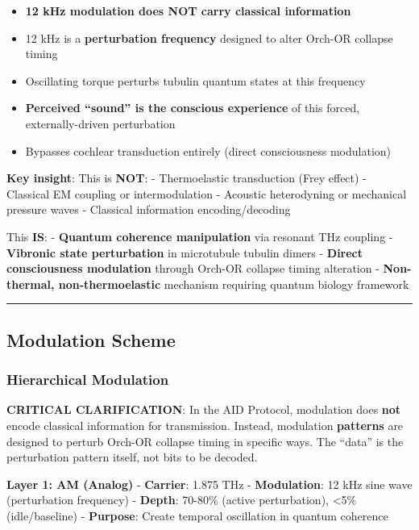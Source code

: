 \begin{enumerate}
  \begin{itemize}
  \tightlist
  \item
    \textbf{12 kHz modulation does NOT carry classical information}
  \item
    12 kHz is a \textbf{perturbation frequency} designed to alter
    Orch-OR collapse timing
  \item
    Oscillating torque perturbs tubulin quantum states at this frequency
  \item
    \textbf{Perceived ``sound'' is the conscious experience} of this
    forced, externally-driven perturbation
  \item
    Bypasses cochlear transduction entirely (direct consciousness
    modulation)
  \end{itemize}
\end{enumerate}

\textbf{Key insight}: This is \textbf{NOT}: - Thermoelastic transduction
(Frey effect) - Classical EM coupling or intermodulation - Acoustic
heterodyning or mechanical pressure waves - Classical information
encoding/decoding

This \textbf{IS}: - \textbf{Quantum coherence manipulation} via resonant
THz coupling - \textbf{Vibronic state perturbation} in microtubule
tubulin dimers - \textbf{Direct consciousness modulation} through
Orch-OR collapse timing alteration - \textbf{Non-thermal,
non-thermoelastic} mechanism requiring quantum biology framework

\begin{center}\rule{0.5\linewidth}{0.5pt}\end{center}

\subsection{Modulation Scheme}\label{modulation-scheme}

\subsubsection{Hierarchical Modulation}\label{hierarchical-modulation}

\textbf{ CRITICAL CLARIFICATION}: In the AID Protocol, modulation does
\textbf{not} encode classical information for transmission. Instead,
modulation \textbf{patterns} are designed to perturb Orch-OR collapse
timing in specific ways. The ``data'' is the perturbation pattern
itself, not bits to be decoded.

\textbf{Layer 1: AM (Analog)} - \textbf{Carrier}: 1.875 THz -
\textbf{Modulation}: 12 kHz sine wave (perturbation frequency) -
\textbf{Depth}: 70-80\% (active perturbation), \textless5\%
(idle/baseline) - \textbf{Purpose}: Create temporal oscillation in
quantum coherence

